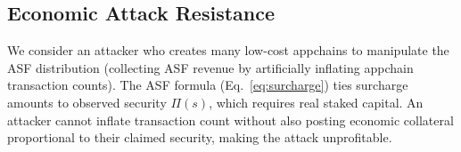 \subsection{Economic Attack Resistance}

We consider an attacker who creates many low-cost appchains to manipulate the ASF
distribution (collecting ASF revenue by artificially inflating appchain transaction counts).
The ASF formula (Eq.~\ref{eq:surcharge}) ties surcharge amounts to observed security
$\Pi(s)$, which requires real staked capital. An attacker cannot inflate transaction
count without also posting economic collateral proportional to their claimed security,
making the attack unprofitable.

